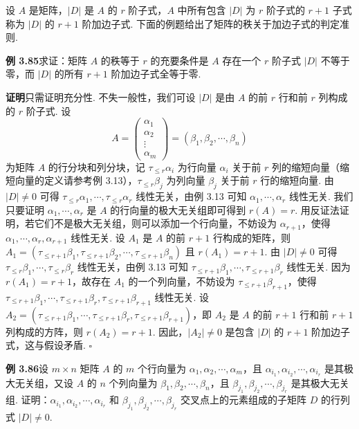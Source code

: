 \documentclass[UTF8, 12pt, fontset=fandol, oneside]{ctexart}
\begin{document}
设 $A$ 是矩阵，$|D|$ 是 $A$ 的 $r$ 阶子式，$A$ 中所有包含 $|D|$ 为 $r$ 阶子式的 $r+1$ 子式称为 $|D|$ 的 $r+1$ 阶加边子式. 下面的例题给出了矩阵的秩关于加边子式的判定准则.

\noindent\textbf{例 3.85}\quad 求证：矩阵 $A$ 的秩等于 $r$ 的充要条件是 $A$ 存在一个 $r$ 阶子式 $|D|$ 不等于零，而 $|D|$ 的所有 $r+1$ 阶加边子式全等于零.

\noindent\textbf{证明}\quad 只需证明充分性. 不失一般性，我们可设 $|D|$ 是由 $A$ 的前 $r$ 行和前 $r$ 列构成的 $r$ 阶子式. 设
\[
A=\begin{pmatrix}\alpha_1\\\alpha_2\\\vdots\\\alpha_m\end{pmatrix}
=(\beta_1,\beta_2,\cdots,\beta_n)
\]
为矩阵 $A$ 的行分块和列分块，记 $\tau_{\le r}\alpha_i$ 为行向量 $\alpha_i$ 关于前 $r$ 列的缩短向量（缩短向量的定义请参考例 3.13），$\tau_{\le r}\beta_j$ 为列向量 $\beta_j$ 关于前 $r$ 行的缩短向量. 由 $|D|\ne 0$ 可得 $\tau_{\le r}\alpha_1,\cdots,\tau_{\le r}\alpha_r$ 线性无关，由例 3.13 可知 $\alpha_1,\cdots,\alpha_r$ 线性无关. 我们只要证明 $\alpha_1,\cdots,\alpha_r$ 是 $A$ 的行向量的极大无关组即可得到 $r(A)=r$. 用反证法证明，若它们不是极大无关组，则可以添加一个行向量，不妨设为 $\alpha_{r+1}$，使得 $\alpha_1,\cdots,\alpha_r,\alpha_{r+1}$ 线性无关. 设 $A_1$ 是 $A$ 的前 $r+1$ 行构成的矩阵，则 $A_1=(\tau_{\le r+1}\beta_1,\tau_{\le r+1}\beta_2,\cdots,\tau_{\le r+1}\beta_n)$ 且 $r(A_1)=r+1$. 由 $|D|\ne 0$ 可得 $\tau_{\le r}\beta_1,\cdots,\tau_{\le r}\beta_r$ 线性无关，由例 3.13 可知 $\tau_{\le r+1}\beta_1,\cdots,\tau_{\le r+1}\beta_r$ 线性无关. 因为 $r(A_1)=r+1$，故存在 $A_1$ 的一个列向量，不妨设为 $\tau_{\le r+1}\beta_{r+1}$，使得 $\tau_{\le r+1}\beta_1,\cdots,\tau_{\le r+1}\beta_r,\tau_{\le r+1}\beta_{r+1}$ 线性无关. 设 $A_2=(\tau_{\le r+1}\beta_1,\cdots,\tau_{\le r+1}\beta_r,\tau_{\le r+1}\beta_{r+1})$，即 $A_2$ 是 $A$ 的前 $r+1$ 行和前 $r+1$ 列构成的方阵，则 $r(A_2)=r+1$. 因此，$|A_2|\ne 0$ 是包含 $|D|$ 的 $r+1$ 阶加边子式，这与假设矛盾. $\square$

\noindent\textbf{例 3.86}\quad 设 $m\times n$ 矩阵 $A$ 的 $m$ 个行向量为 $\alpha_1,\alpha_2,\cdots,\alpha_m$，且 $\alpha_{i_1},\alpha_{i_2},\cdots,\alpha_{i_r}$ 是其极大无关组，又设 $A$ 的 $n$ 个列向量为 $\beta_1,\beta_2,\cdots,\beta_n$，且 $\beta_{j_1},\beta_{j_2},\cdots,\beta_{j_r}$ 是其极大无关组. 证明：$\alpha_{i_1},\alpha_{i_2},\cdots,\alpha_{i_r}$ 和 $\beta_{j_1},\beta_{j_2},\cdots,\beta_{j_r}$ 交叉点上的元素组成的子矩阵 $D$ 的行列式 $|D|\ne 0$.
\end{document}
